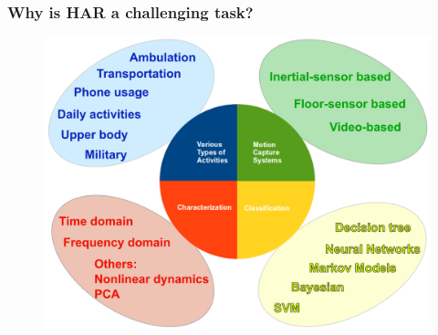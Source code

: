\documentclass{beamer}
\begin{document}
\begin{frame}
	\frametitle{Why is HAR a challenging task?}
\vspace{-0.5cm}
\begin{figure}
 \includegraphics[scale=.3]{har01}
\vspace{-0.6cm}
\end{figure}
\end{frame}





\end{document}
